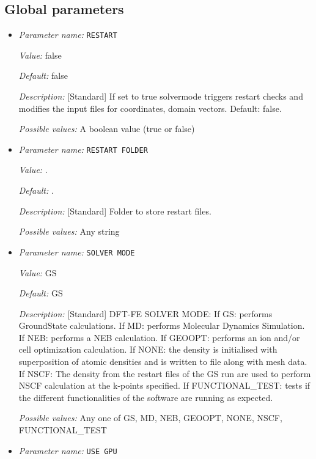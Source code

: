 \subsection{Global parameters}
\label{parameters:global}

\begin{itemize}
\item {\it Parameter name:} {\tt RESTART}
\label{parameters:RESTART}


{\it Value:} false


{\it Default:} false


{\it Description:} [Standard] If set to true solvermode triggers restart checks and modifies the input files for coordinates, domain vectors. Default: false.


{\it Possible values:} A boolean value (true or false)
\item {\it Parameter name:} {\tt RESTART FOLDER}
\label{parameters:RESTART FOLDER}
\label{parameters:RESTART_20FOLDER}


{\it Value:} .


{\it Default:} .


{\it Description:} [Standard] Folder to store restart files.


{\it Possible values:} Any string
\item {\it Parameter name:} {\tt SOLVER MODE}
\label{parameters:SOLVER MODE}
\label{parameters:SOLVER_20MODE}


{\it Value:} GS


{\it Default:} GS


{\it Description:} [Standard] DFT-FE SOLVER MODE: If GS: performs GroundState calculations. If MD: performs Molecular Dynamics Simulation. If NEB: performs a NEB calculation. If GEOOPT: performs an ion and/or cell optimization calculation. If NONE: the density is initialised with superposition of atomic densities and is written to file along with mesh data. If NSCF: The density from the restart files of the GS run are used to perform NSCF calculation at the k-points specified.  If FUNCTIONAL\_TEST: tests if the different functionalities of the software are running as expected.


{\it Possible values:} Any one of GS, MD, NEB, GEOOPT, NONE, NSCF, FUNCTIONAL\_TEST
\item {\it Parameter name:} {\tt USE GPU}
\label{parameters:USE GPU}
\label{parameters:USE_20GPU}



\end{itemize}
